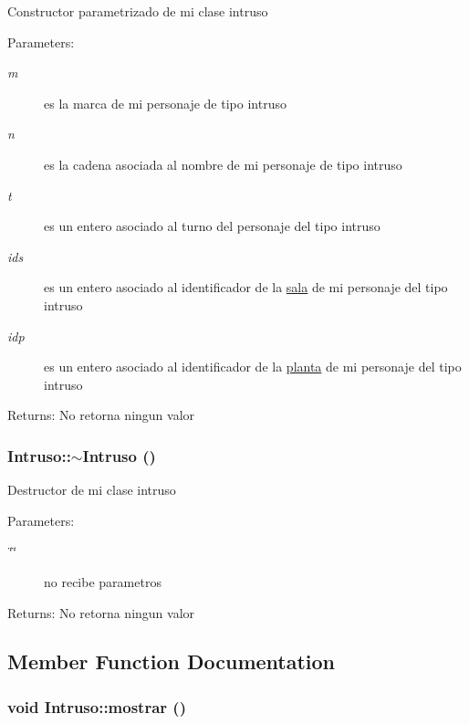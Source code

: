 Constructor parametrizado de mi clase intruso \begin{Desc}
\item[Parameters:]
\begin{description}
\item[{\em m}]es la marca de mi personaje de tipo intruso \item[{\em n}]es la cadena asociada al nombre de mi personaje de tipo intruso \item[{\em t}]es un entero asociado al turno del personaje del tipo intruso \item[{\em ids}]es un entero asociado al identificador de la \hyperlink{classsala}{sala} de mi personaje del tipo intruso \item[{\em idp}]es un entero asociado al identificador de la \hyperlink{classplanta}{planta} de mi personaje del tipo intruso \end{description}
\end{Desc}
\begin{Desc}
\item[Returns:]No retorna ningun valor \end{Desc}
\hypertarget{classIntruso_947673866dbb60c76b40eff5ab139bcd}{
\subsubsection[$\sim$Intruso]{\setlength{\rightskip}{0pt plus 5cm}Intruso::$\sim$Intruso ()}}
\label{classIntruso_947673866dbb60c76b40eff5ab139bcd}


Destructor de mi clase intruso \begin{Desc}
\item[Parameters:]
\begin{description}
\item[{\em \char`\"{}\char`\"{}}]no recibe parametros \end{description}
\end{Desc}
\begin{Desc}
\item[Returns:]No retorna ningun valor \end{Desc}


\subsection{Member Function Documentation}
\hypertarget{classIntruso_06a5d236e669e5add8b1c6472303133e}{
\subsubsection[mostrar]{\setlength{\rightskip}{0pt plus 5cm}void Intruso::mostrar ()}}
\label{classIntruso_06a5d236e669e5add8b1c6472303133e}


